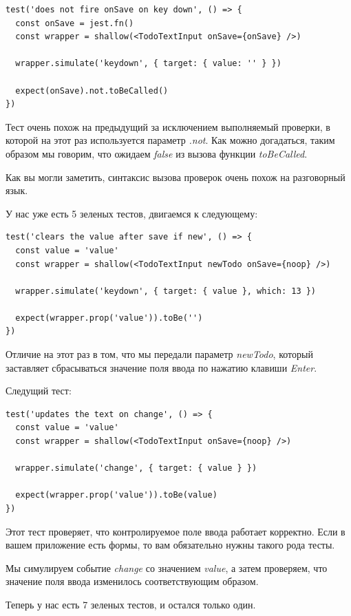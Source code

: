 \begin{lstlisting}
test('does not fire onSave on key down', () => {
  const onSave = jest.fn()
  const wrapper = shallow(<TodoTextInput onSave={onSave} />)
  
  wrapper.simulate('keydown', { target: { value: '' } })
  
  expect(onSave).not.toBeCalled()
})
\end{lstlisting}

Тест очень похож на предыдущий за исключением выполняемый проверки, в которой на этот раз используется параметр \textit{.not}. Как можно догадаться, таким образом мы говорим, что ожидаем \textit{false} из вызова функции \textit{toBeCalled}.

Как вы могли заметить, синтаксис вызова проверок очень похож на разговорный язык.

У нас уже есть 5 зеленых тестов, двигаемся к следующему:

\begin{lstlisting}
test('clears the value after save if new', () => {
  const value = 'value'
  const wrapper = shallow(<TodoTextInput newTodo onSave={noop} />)
  
  wrapper.simulate('keydown', { target: { value }, which: 13 })
  
  expect(wrapper.prop('value')).toBe('')
})
\end{lstlisting}

Отличие на этот раз в том, что мы передали параметр \textit{newTodo}, который заставляет сбрасываться значение поля ввода по нажатию клавиши \textit{Enter}.

Следущий тест:

\begin{lstlisting}
test('updates the text on change', () => {
  const value = 'value'
  const wrapper = shallow(<TodoTextInput onSave={noop} />)
  
  wrapper.simulate('change', { target: { value } })
  
  expect(wrapper.prop('value')).toBe(value)
})
\end{lstlisting}

Этот тест проверяет, что контролируемое поле ввода работает корректно. Если в вашем приложение есть формы, то вам обязательно нужны такого рода тесты.

Мы симулируем событие \textit{change} со значением \textit{value}, а затем проверяем, что значение поля ввода изменилось соответствующим образом.

Теперь у нас есть 7 зеленых тестов, и остался только один.

